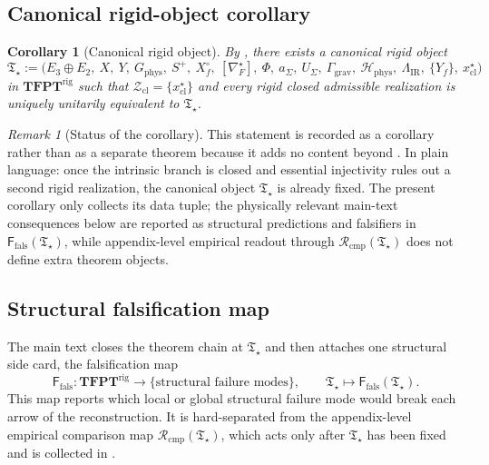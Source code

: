 \documentclass[11pt,a4paper]{article}
\newtheorem{corollary}[theorem]{Corollary}
\theoremstyle{definition}
\theoremstyle{remark}
\newtheorem*{remark}{Remark}
\newcommand{\Tstar}{\mathfrak T_{\star}}
\newcommand{\Ffals}{\mathsf F_{\mathrm{fals}}}
\newcommand{\Rcmp}{\mathcal R_{\mathrm{cmp}}}
\begin{document}
\subsection{Canonical rigid-object corollary}

\begin{corollary}[Canonical rigid object]
\label{cor:canonical-rigid-object}
By ,
there exists a canonical rigid object
\[
\Tstar
:=
\bigl(
E_3\oplus E_2,\ X,\ Y,\ G_{\mathrm{phys}},\ S^+,\ X_f^\circ,\ [\nabla_F^\star],\ \Phi,\ a_\Sigma,\ U_\Sigma,\ \Gamma_{\mathrm{grav}},\ \mathcal H_{\mathrm{phys}},\ \Lambda_{\mathrm{IR}},\ \{Y_f\},\ x_{\mathrm{cl}}^\star
\bigr)
\]
in $\mathbf{TFPT}^{\mathrm{rig}}$ such that $\mathcal Z_{\mathrm{cl}}=\{x_{\mathrm{cl}}^\star\}$
and every rigid closed admissible realization is uniquely unitarily equivalent to $\Tstar$.
\end{corollary}

\begin{remark}[Status of the corollary]
This statement is recorded as a corollary rather than as a separate theorem because it adds no
content beyond .
In plain language: once the intrinsic branch is closed and essential injectivity rules out a
second rigid realization, the canonical object $\Tstar$ is already fixed. The present corollary
only collects its data tuple; the physically relevant main-text consequences below are reported as
structural predictions and falsifiers in $\Ffals(\Tstar)$, while appendix-level empirical readout
through $\Rcmp(\Tstar)$ does not define extra theorem objects.
\end{remark}

\subsection{Structural falsification map}
\label{sec:structural-falsification-map}

The main text closes the theorem chain at $\Tstar$ and then attaches one structural side card,
the falsification map
\[
\Ffals:\mathbf{TFPT}^{\mathrm{rig}}\to\{\text{structural failure modes}\},
\qquad
\Tstar\mapsto \Ffals(\Tstar).
\]
This map reports which local or global structural failure mode would break each arrow of the
reconstruction. It is hard-separated from the appendix-level empirical comparison map
$\Rcmp(\Tstar)$, which acts only after $\Tstar$ has been fixed and is collected in
.
\end{document}
